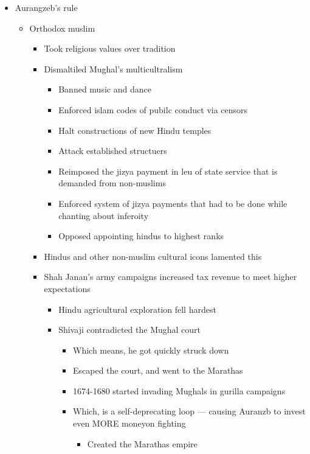 \documentclass[letterpaper]{article}
\begin{document}
\begin{itemize}
\item Aurangzeb's rule

\begin{itemize}
\item Orthodox muslim

\begin{itemize}
\item Took religious values over tradition
\item Dismaltiled Mughal's multicultralism

\begin{itemize}
\item Banned music and dance
\item Enforced islam codes of pubilc conduct via censors
\item Halt constructions of new Hindu temples
\item Attack established structuers
\item Reimposed the jizya payment in leu of state service that is
demanded from non-muslims
\item Enforced system of jizya payments that had to be done while
chanting about inferoity
\item Opposed appointing hindus to highest ranks
\end{itemize}

\item Hindus and other non-muslim cultural icons lamented this
\item Shah Janan's army campaigns increased tax revenue to meet higher
expectations

\begin{itemize}
\item Hindu agricultural exploration fell hardest
\item Shivaji contradicted the Mughal court

\begin{itemize}
\item Which means, he got quickly struck down
\item Escaped the court, and went to the Marathas
\item 1674-1680 started invading Mughals in gurilla campaigns
\item Which, is a self-deprecating loop --- causing Auranzb to
invest even MORE moneyon fighting

\begin{itemize}
\item Created the Marathas empire
\end{itemize}
\end{itemize}


\end{itemize}
\end{itemize}
\end{itemize}
\end{itemize}
\end{document}
